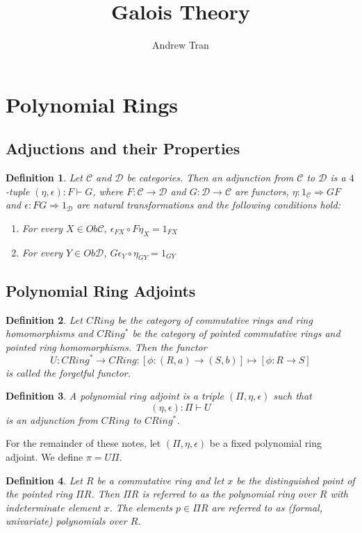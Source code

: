 \documentclass[12pt]{article}
\title{Galois Theory}
\author{Andrew Tran}
\date{}
\newtheorem{defn}{Definition}
\begin{document}
\maketitle

\section{Polynomial Rings}
\subsection{Adjuctions and their Properties}
\begin{defn}
  Let $\mathscr{C}$  and $\mathscr{D}$ be categories. Then an adjunction from $\mathscr{C}$ to $\mathscr{D}$ is a $4$-tuple $(\eta,\epsilon):F\vdash G$, where $F:\mathscr{C}\to\mathscr{D}$ and $G:\mathscr{D}\to\mathscr{C}$ are functors, $\eta:1_{\mathscr{C}}\Rightarrow GF$ and $\epsilon:FG\Rightarrow1_{\mathscr{D}}$ are natural transformations and the following conditions hold:
  \begin{enumerate}
    \item For every $X \in Ob\mathscr{C}$, $\epsilon_{FX}\circ F\eta_{X} = 1_{FX}$ 
    \item For every $Y \in Ob\mathscr{D}$, $G\epsilon_{Y}\circ\eta_{GY} = 1_{GY}$
  \end{enumerate}
\end{defn}

\subsection{Polynomial Ring Adjoints}
\begin{defn}
  Let $CRing$ be the category of commutative rings and ring homomorphisms and $CRing^{*}$ be the category of pointed commutative rings and pointed ring homomorphisms. Then the functor $$U:CRing^{*}\to CRing:[\phi:(R,a)\to(S,b)]\mapsto[\phi:R\to S]$$ is called the forgetful functor.
\end{defn}

\begin{defn}
  A polynomial ring adjoint is a triple $(\Pi,\eta,\epsilon)$ such that $$(\eta,\epsilon):\Pi\vdash U$$ is an adjunction from $CRing$ to $CRing^{*}$.
\end{defn}

\noindent For the remainder of these notes, let $(\Pi,\eta,\epsilon)$ be a fixed polynomial ring adjoint. We define $\pi = U\Pi$. 

\begin{defn} 
  Let $R$ be a commutative ring and let $x$ be the distinguished point of the pointed ring $\Pi R$. Then $\Pi R$ is referred to as the polynomial ring over $R$ with indeterminate element $x$. The elements $p \in \Pi R$ are referred to as (formal, univariate) polynomials over $R$.
\end{defn}
\end{document}
